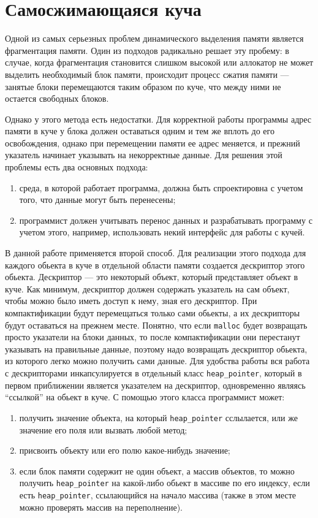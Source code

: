 \section{Самосжимающаяся куча}

Одной из самых серьезных проблем динамического выделения памяти является фрагментация памяти. Один из подходов
радикально решает эту пробему: в случае, когда фрагментация становится слишком высокой или аллокатор не может выделить 
необходимый блок памяти, происходит процесс сжатия памяти --- занятые блоки перемещаются таким образом по куче, что между ними не 
остается свободных блоков.

Однако у этого метода есть недостатки. Для корректной работы программы адрес памяти
в куче у блока должен оставаться одним и тем же вплоть до его освобождения, однако при перемещении памяти ее адрес
меняется, и прежний указатель начинает указывать на некорректные данные. Для решения этой проблемы есть два основных подхода:

\begin{enumerate}
\item среда, в которой работает программа, должна быть спроектировна с учетом того,
      что данные могут быть перенесены;
\item программист должен учитывать перенос данных и разрабатывать программу с учетом
      этого, например, использовать некий интерфейс для работы с кучей.
\end{enumerate}

В данной работе применяется второй способ. Для реализации этого подхода для каждого 
обьекта в куче в отдельной области памяти создается дескриптор этого обьекта. Дескриптор --- 
это некоторый объект, который представляет объект в куче. Как минимум, дескриптор должен 
содержать указатель на сам объект, чтобы можно было иметь доступ к нему, зная его дескриптор.
При компактификации будут перемещаться только сами обьекты, а их дескрипторы будут 
оставаться на прежнем месте. Понятно, что если \lstinline{malloc} будет возвращать 
просто указатели на блоки данных, то после компактификации они перестанут указывать
на правильные данные, поэтому надо возвращать дескриптор  обьекта, из которого легко
можно получить сами данные. Для удобства работы вся работа с дескрипторами инкапсулируется
в отдельный класс \lstinline{heap_pointer}, который в первом приближении является указателем
на дескриптор, одновременно являясь ``ссылкой'' на обьект в куче. С помощью этого 
класса программист может:

\begin{enumerate}
\item получить значение объекта, на который \lstinline{heap_pointer} сслылается, или же значение
его поля или вызвать любой метод;
\item присвоить объекту или его полю какое-нибудь значение; 
\item если блок памяти содержит не один объект, а массив объектов, то можно получить
\lstinline{heap_pointer} на какой-либо обьект в массиве по его индексу, если есть 
\lstinline{heap_pointer}, ссылающийся на начало массива (также в этом месте можно 
проверять массив на переполнение).
\end{enumerate}  

